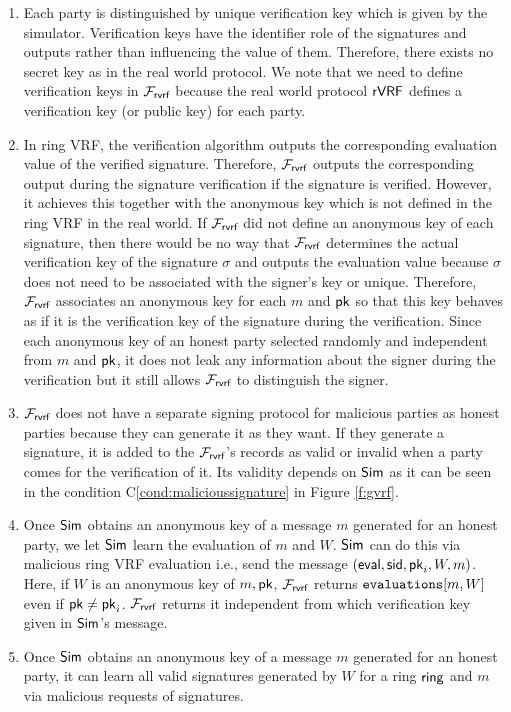 \begin{enumerate}[label={{R-} }{{\arabic*}}, start = 1]
	\item Each party is distinguished by unique verification key which is given by the simulator. Verification keys have the identifier role of  the signatures and outputs rather than  influencing the value of them. Therefore, there exists no secret key as in the real world protocol. We note that we need to define verification keys in $ \mathcal{F}_{\textsf{rvrf}} $ because the real world protocol $ {\mathsf{rVRF}} $ defines a verification key (or public key) for each party.
	
	\item In ring VRF, the verification algorithm outputs the corresponding evaluation value of the verified signature. Therefore, $ \mathcal{F}_{\textsf{rvrf}} $  outputs the corresponding output during the signature verification if the signature is verified. However, it achieves this together with the anonymous key which is not defined in the ring VRF in the real world.  If $ \mathcal{F}_{\textsf{rvrf}} $ did not define an anonymous key of each signature, then there would be no way that $ \mathcal{F}_{\textsf{rvrf}} $ determines the actual verification key of the signature $ \sigma $ and outputs the evaluation value because $ \sigma $ does not need to be associated with the signer's key or unique. Therefore, $ \mathcal{F}_{\textsf{rvrf}} $ associates an anonymous key for each $ m $ and $ \mathsf{pk} $ so that this key behaves as if it is the verification key of the signature during the verification. Since each anonymous key of an honest party selected randomly and independent from $ m $ and $ \mathsf{pk} $, it does not leak any information about the signer during the verification but it still allows $ \mathcal{F}_{\textsf{rvrf}} $ to distinguish the signer.
	
	\item $ \mathcal{F}_{\textsf{rvrf}} $ does not have a separate signing protocol for malicious parties as honest parties because they can generate it as they want. If they generate a signature, it is added to the $ \mathcal{F}_{\textsf{rvrf}} $'s records as valid or invalid when a party comes for the verification of it.  Its validity depends on $ \mathsf{Sim} $ as it can be seen in  the condition C\ref{cond:malicioussignature} in Figure \ref{f:gvrf}. 
	
	\item Once $ \mathsf{Sim} $ obtains an anonymous key of a message $ m $ generated for an honest party, we let $ \mathsf{Sim} $ learn the  evaluation of  $ m $ and  $ W $. $ \mathsf{Sim} $ can do this via malicious ring VRF evaluation i.e., send the message $ (\mathsf{eval}, \textsf{sid}, \mathsf{pk}_i,W,m) $. Here, if $ W $ is an anonymous key of $ m, \mathsf{pk}  $, $ \mathcal{F}_{\textsf{rvrf}} $ returns $ \texttt{evaluations}[m, W] $ even if $ \mathsf{pk} \neq \mathsf{pk}_i $. $ \mathcal{F}_{\textsf{rvrf}} $ returns it independent from which verification key given in $ \mathsf{Sim} $'s message. 
	
	\item Once $ \mathsf{Sim} $ obtains an anonymous key of a message $ m $ generated for an honest party, it can learn all valid signatures generated by $ W $ for a ring $ \mathsf{ring} $ and $ m $ via malicious requests of signatures.
	
\end{enumerate}
